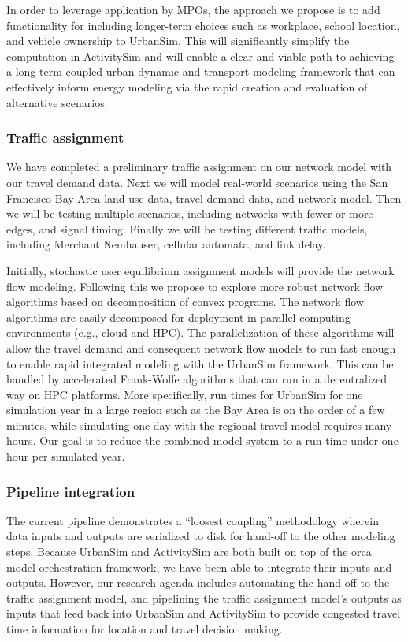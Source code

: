 In order to leverage application by MPOs, the approach we propose is to add functionality for including longer-term choices such as workplace, school location, and vehicle ownership to UrbanSim. This will significantly simplify the computation in ActivitySim and will enable a clear and viable path to achieving a long-term coupled urban dynamic and transport modeling framework that can effectively inform energy modeling via the rapid creation and evaluation of alternative scenarios. 

\subsubsection{Traffic assignment}

We have completed a preliminary traffic assignment on our network model with our travel demand data. Next we will model real-world scenarios using the San Francisco Bay Area land use data, travel demand data, and network model. Then we will be testing multiple scenarios, including networks with fewer or more edges, and signal timing. Finally we will be testing different traffic models, including Merchant Nemhauser, cellular automata, and link delay.

Initially, stochastic user equilibrium assignment models will provide the network flow modeling. Following this we propose to explore more robust network flow algorithms based on decomposition of convex programs. The network flow algorithms are easily decomposed for deployment in parallel computing environments (e.g., cloud and HPC). The parallelization of these algorithms will allow the travel demand and consequent network flow models to run fast enough to enable rapid integrated modeling with the UrbanSim framework. This can be handled by accelerated Frank-Wolfe algorithms that can run in a decentralized way on HPC platforms. More specifically, run times for UrbanSim for one simulation year in a large region such as the Bay Area is on the order of a few minutes, while simulating one day with the regional travel model requires many hours. Our goal is to reduce the combined model system to a run time under one hour per simulated year.

\subsubsection{Pipeline integration}

The current pipeline demonstrates a \enquote{loosest coupling} methodology wherein data inputs and outputs are serialized to disk for hand-off to the other modeling steps. Because UrbanSim and ActivitySim are both built on top of the orca model orchestration framework, we have been able to integrate their inputs and outputs. However, our research agenda includes automating the hand-off to the traffic assignment model, and pipelining the traffic assignment model's outputs as inputs that feed back into UrbanSim and ActivitySim to provide congested travel time information for location and travel decision making.


